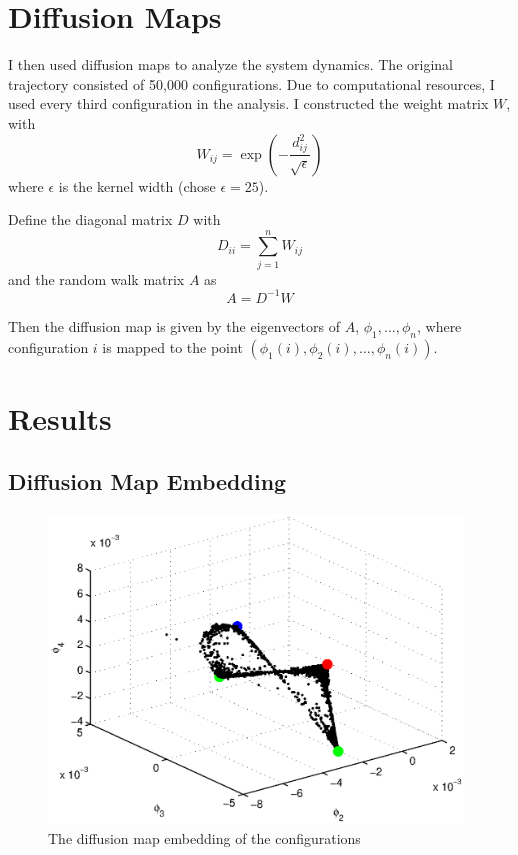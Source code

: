 \section{Diffusion Maps}
I then used diffusion maps to analyze the system dynamics. The original trajectory consisted of 50,000 configurations. Due to computational resources, I used every third configuration in the analysis. I constructed the weight matrix $W$, with
$$W_{ij}=\exp\left(-\frac{d_{ij}^2}{\sqrt{\epsilon}}\right)$$
where $\epsilon$ is the kernel width (chose $\epsilon=25$). 

Define the diagonal matrix $D$ with
$$D_{ii}=\sum_{j=1}^{n}W_{ij}$$
and the random walk matrix $A$ as
$$A=D^{-1}W$$

Then the diffusion map is given by the eigenvectors of $A$, $\phi_{1},\dots,\phi_{n}$, where configuration $i$ is mapped to the point $(\phi_{1}(i),\phi_{2}(i),\dots,\phi_{n}(i))$.

\section{Results}

\subsection{Diffusion Map Embedding}

\begin{figure}[t]
\includegraphics[width=11cm]{dmap}
\caption[Diffusion maps embedding of Lennard-Jones cluster]{The diffusion map embedding of the configurations}
\label{dmap}
\end{figure}

